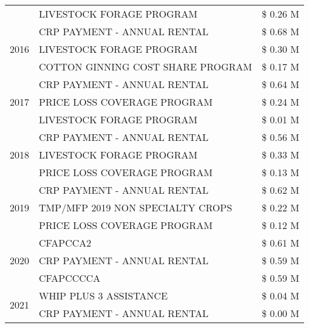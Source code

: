\begin{tabular}{llr}
 & LIVESTOCK FORAGE PROGRAM & \$ 0.26 M \\
\cline{1-3}
\multirow[t]{3}{*}{2016} & CRP PAYMENT - ANNUAL RENTAL & \$ 0.68 M \\
 & LIVESTOCK FORAGE PROGRAM & \$ 0.30 M \\
 & COTTON GINNING COST SHARE PROGRAM & \$ 0.17 M \\
\cline{1-3}
\multirow[t]{3}{*}{2017} & CRP PAYMENT - ANNUAL RENTAL & \$ 0.64 M \\
 & PRICE LOSS COVERAGE PROGRAM & \$ 0.24 M \\
 & LIVESTOCK FORAGE PROGRAM & \$ 0.01 M \\
\cline{1-3}
\multirow[t]{3}{*}{2018} & CRP PAYMENT - ANNUAL RENTAL & \$ 0.56 M \\
 & LIVESTOCK FORAGE PROGRAM & \$ 0.33 M \\
 & PRICE LOSS COVERAGE PROGRAM & \$ 0.13 M \\
\cline{1-3}
\multirow[t]{3}{*}{2019} & CRP PAYMENT - ANNUAL RENTAL & \$ 0.62 M \\
 & TMP/MFP 2019 NON SPECIALTY CROPS & \$ 0.22 M \\
 & PRICE LOSS COVERAGE PROGRAM & \$ 0.12 M \\
\cline{1-3}
\multirow[t]{3}{*}{2020} & CFAPCCA2 & \$ 0.61 M \\
 & CRP PAYMENT - ANNUAL RENTAL & \$ 0.59 M \\
 & CFAPCCCCA & \$ 0.59 M \\
\cline{1-3}
\multirow[t]{2}{*}{2021} & WHIP PLUS 3 ASSISTANCE & \$ 0.04 M \\
 & CRP PAYMENT - ANNUAL RENTAL & \$ 0.00 M \\
\cline{1-3}
\bottomrule
\end{tabular}
